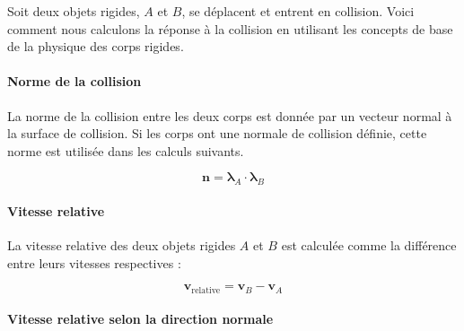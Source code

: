     \newpage

    Soit deux objets rigides, \( A \) et \( B \), se déplacent et entrent
    en collision. Voici comment nous calculons la réponse à la collision
    en utilisant les concepts de base de la physique des corps rigides.

    \begin{multicols}{2}

        \paragraph{Norme de la collision}
        La norme de la collision entre les deux corps est donnée par un vecteur
        normal à la surface de collision. Si les corps ont une normale de
        collision définie, cette norme est utilisée dans les calculs suivants.
    
        
        \begin{equation}
        \mathbf{n} = \mathbf{\lambda}_A \cdot \mathbf{\lambda}_B
        \end{equation}
    
        \paragraph{Vitesse relative}
        La vitesse relative des deux objets rigides \( A \) et \( B \) est calculée
        comme la différence entre leurs vitesses respectives :
    
        
        \begin{equation}
        \mathbf{v}_{\text{relative}} = \mathbf{v}_B - \mathbf{v}_A
        \end{equation}
    
        \paragraph{Vitesse relative selon la direction normale}
        

\end{multicols}
